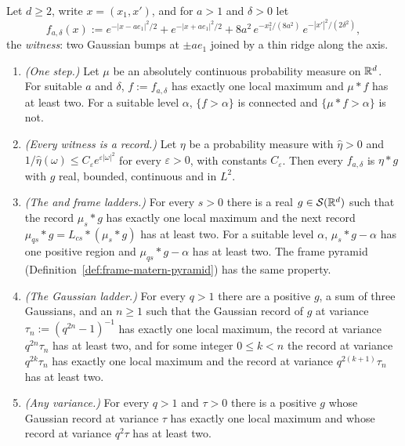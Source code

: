 \begin{proposition}
\label{prop:creation-plane}

Let $d \ge 2$, write $x = (x_1, x')$, and for $a > 1$ and $\delta > 0$ let
\[
  f_{a,\delta}(x) := e^{-|x - ae_1|^2/2} + e^{-|x + ae_1|^2/2}
   + 8a^2\,e^{-x_1^2/(8a^2)}\,e^{-|x'|^2/(2\delta^2)} ,
\]
the \emph{witness}: two Gaussian bumps at $\pm ae_1$ joined by a thin ridge along the axis.
\begin{enumerate}
\item \emph{(One step.)} Let $\mu$ be an absolutely continuous probability measure on
$\mathbb{R}^d$. For suitable $a$ and $\delta$, $f := f_{a,\delta}$ has exactly one
local maximum and $\mu * f$ has at least two. For a suitable level $\alpha$, $\{f > \alpha\}$ is
connected and $\{\mu * f > \alpha\}$ is not.
\item \emph{(Every witness is a record.)} Let $\eta$ be a probability measure with
$\widehat\eta > 0$ and $1/\widehat\eta(\omega) \le C_\varepsilon e^{\varepsilon|\omega|^2}$ for every
$\varepsilon > 0$, with constants $C_\varepsilon$. Then every $f_{a,\delta}$ is $\eta * g$ with $g$
real, bounded, continuous and in $L^2$.
\item \emph{(The \Matern{} and frame \Matern{} ladders.)} For every $s > 0$ there is a real
$g \in \mathcal{S}(\mathbb{R}^d)$ such that the record $\mu_s * g$ has exactly one local maximum and the
next record $\mu_{qs} * g = L_{cs} * (\mu_s * g)$ has at least two. For a suitable level $\alpha$,
$\mu_s * g - \alpha$ has one positive region and $\mu_{qs} * g - \alpha$ has at least two. The frame
\Matern{} pyramid (Definition~\ref{def:frame-matern-pyramid}) has the same property.
\item \emph{(The Gaussian ladder.)} For every $q > 1$ there are a positive $g$, a sum of three
Gaussians, and an $n \ge 1$ such that the Gaussian record of $g$ at variance
$\tau_n := (q^{2n} - 1)^{-1}$ has exactly one local maximum, the record at variance
$q^{2n}\tau_n$ has at least two, and
for some integer $0 \le k < n$ the record at variance $q^{2k}\tau_n$ has exactly one local maximum
and the record at variance $q^{2(k+1)}\tau_n$ has at least two.
\item \emph{(Any variance.)} For every $q > 1$ and $\tau > 0$ there is a positive $g$ whose
Gaussian record at variance $\tau$ has exactly one local maximum and whose record at variance
$q^2\tau$ has at least two.
\end{enumerate}
\end{proposition}

